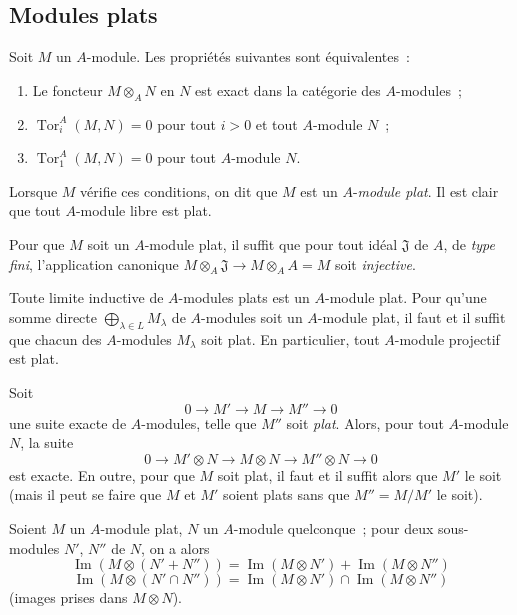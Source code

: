 \subsection{Modules plats}
\label{subsection:0.6.1-fr}

\begin{env}[6.1.1]
\label{0.6.1.1-fr}
Soit $M$ un $A$-module. Les propriétés suivantes sont équivalentes~:
\begin{enumerate}
  \item[$a)$] Le foncteur $M\otimes_A N$ en $N$ est exact dans la catégorie
    des $A$-modules~;
  \item[$b)$] $\operatorname{Tor}_i^A(M,N)=0$ pour tout $i>0$ et tout
    $A$-module $N$~;
  \item[$c)$] $\operatorname{Tor}_1^A(M,N)=0$ pour tout $A$-module $N$.
\end{enumerate}

Lorsque $M$ vérifie ces conditions, on dit que $M$ est un
$A$-\emph{module plat}. Il est clair que tout $A$-module libre est plat.

Pour que $M$ soit un $A$-module plat, il suffit que pour tout idéal
$\mathfrak{J}$ de $A$, de \emph{type fini}, l'application canonique
$M\otimes_A\mathfrak{J}\to M\otimes_A A=M$ soit \emph{injective}.
\end{env}

\begin{env}[6.1.2]
Toute limite inductive de $A$-modules plats est un $A$-module plat. Pour
qu'une somme directe $\bigoplus_{\lambda\in L}M_\lambda$ de $A$-modules soit
un $A$-module plat, il faut et il suffit que chacun des $A$-modules
$M_\lambda$ soit plat. En particulier, tout $A$-module projectif est plat.

Soit
\[
  0\longrightarrow M'\longrightarrow M\longrightarrow M''\longrightarrow 0
\]
une suite exacte de $A$-modules, telle que $M''$ soit \emph{plat}. Alors, pour
tout $A$-module $N$, la suite
\[
  0\longrightarrow M'\otimes N\longrightarrow M\otimes N
  \longrightarrow M''\otimes N\longrightarrow 0
\]
est exacte. En outre, pour que $M$ soit plat, il faut et il suffit alors que
$M'$ le soit (mais il peut se faire que $M$ et $M'$ soient plats sans que
$M''=M/M'$ le soit).
\end{env}

\begin{env}[6.1.3]
\label{0.6.1.3-fr}
Soient $M$ un $A$-module plat, $N$ un $A$-module quelconque~; pour deux
sous-modules $N'$, $N''$ de $N$, on a alors
\[
  \operatorname{Im}(M\otimes(N'+N''))
  =\operatorname{Im}(M\otimes N')+\operatorname{Im}(M\otimes N'')
\]
\[
  \operatorname{Im}(M\otimes(N'\cap N''))
  =\operatorname{Im}(M\otimes N')\cap\operatorname{Im}(M\otimes N'')
\]
(images prises dans $M\otimes N$).
\end{env}

